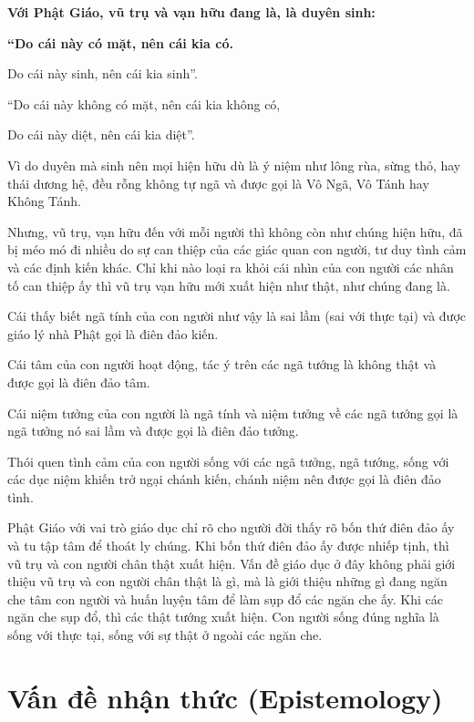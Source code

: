 {\bf Với Phật Giáo, vũ trụ và vạn hữu đang là, là duyên sinh:}


{\bf ``Do cái này có mặt, nên cái kia có.

Do cái này sinh, nên cái kia sinh''.

``Do cái này không có mặt, nên cái kia không có,

Do cái này diệt, nên cái kia diệt''.}

Vì do duyên mà sinh nên mọi hiện hữu dù là ý niệm như lông rùa, sừng thỏ, hay thái dương hệ, đều rỗng không tự ngã và được gọi là Vô Ngã, Vô Tánh hay Không Tánh.

Nhưng, vũ trụ, vạn hữu đến với mỗi người thì không còn như chúng hiện hữu, đã bị méo mó đi nhiều do sự can thiệp của các giác quan con người, tư duy tình cảm và các định kiến khác. Chỉ khi nào loại ra khỏi cái nhìn của con người các nhân tố can thiệp ấy thì vũ trụ vạn hữu mới xuất hiện như thật, như chúng đang là.

Cái thấy biết ngã tính của con người như vậy là sai lầm (sai với thực tại) và được giáo lý nhà Phật gọi là điên đảo kiến.

Cái tâm của con người hoạt động, tác ý trên các ngã tướng là không thật và được gọi là điên đảo tâm.

Cái niệm tưởng của con người là ngã tính và niệm tưởng về các ngã tướng gọi là ngã tưởng nó sai lầm và được gọi là điên đảo tưởng.

Thói quen tình cảm của con người sống với các ngã tưởng, ngã tướng, sống với các dục niệm khiến trở ngại chánh kiến, chánh niệm nên được gọi là điên đảo tình.

Phật Giáo với vai trò giáo dục chỉ rõ cho người đời thấy rõ bốn thứ điên đảo ấy và tu tập tâm để thoát ly chúng. Khi bốn thứ điên đảo ấy được nhiếp tịnh, thì vũ trụ và con người chân thật xuất hiện. Vấn đề giáo dục ở đây không phải giới thiệu vũ trụ và con người chân thật là gì, mà là giới thiệu những gì đang ngăn che tâm con người và huấn luyện tâm để làm sụp đổ các ngăn che ấy. Khi các ngăn che sụp đổ, thì các thật tướng xuất hiện. Con người sống đúng nghĩa là sống với thực tại, sống với sự thật ở ngoài các ngăn che.


\section{Vấn đề nhận thức (Epistemology)} %
\label{sec:van_de_nhan_thuc}

